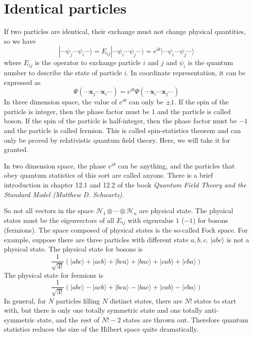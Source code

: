 \section{Identical particles}
If two particles are identical, their exchange must not change physical quantities, so we have
\[|\cdots\psi_j\cdots\psi_i\cdots\rangle = E_{ij}|\cdots\psi_i\cdots\psi_j\cdots\rangle = e^{i\theta} |\cdots\psi_i\cdots\psi_j\cdots\rangle\]
where $E_{ij}$ is the operator to exchange particle $i$ and $j$ and $\psi_i$ is the quantum number to describe the state of particle $i$.
In coordinate representation, it can be expressed as
\[\Psi(\cdots\bm{x}_j\cdots\bm{x}_i\cdots) = e^{i\theta} \Psi(\cdots\bm{x}_i\cdots\bm{x}_j\cdots)\]
In three dimension space, the value of $e^{i\theta}$ can only be $\pm 1$. If the spin of the particle is integer, then the phase factor must be $1$ and the particle is called boson. If the spin of the particle is half-integer, then the phase factor must be $-1$ and the particle is called fermion. This is called spin-statistics theorem and can only be proved by relativistic quantum field theory. Here, we will take it for granted.
\begin{note}
In two dimension space, the phase $e^{i\theta}$ can be anything, and the particles that obey quantum statistics of this sort are called anyons. There is a brief introduction in chapter 12.1 and
12.2 of the book \emph{Quantum Field Theory and the Standard Model (Matthew D. Schwartz)}.
\end{note}
\noindent
So not all vectors in the space $\mathcal{H}_1\otimes\cdots\otimes\mathcal{H}_n$ are physical state. The physical states must be the eigenvectors of all $E_{ij}$ with eigenvalue $1$ ($-1$) for bosons (fermions). The space composed of physical states is the so-called Fock space. For example, suppose there are three particles with different state $a,b,c$. $|abc\rangle$ is not a physical state. The physical state for bosons is
\[\frac{1}{\sqrt{3!}} \left( |abc\rangle + |acb\rangle + |bca\rangle + |bac\rangle + |cab\rangle + |cba\rangle\right)\]
The physical state for fermions is
\[\frac{1}{\sqrt{3!}} \left( |abc\rangle - |acb\rangle + |bca\rangle - |bac\rangle + |cab\rangle - |cba\rangle\right)\]
In general, for $N$ particles filling $N$ distinct states, there are $N!$ states to start with, but there is only one totally symmetric state and one totally anti-symmetric state, and the rest of $N!-2$ states are thrown out. Therefore quantum statistics reduces the size of the Hilbert space quite dramatically.\\
